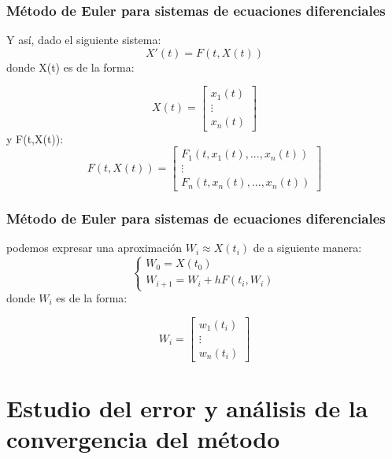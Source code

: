 \documentclass{beamer}
\begin{document}
\begin{frame}
	\frametitle{Método de Euler para sistemas de ecuaciones diferenciales}
	
	Y así, dado el siguiente sistema: $$
	X'(t)=F(t,X(t))
	$$
	donde X(t) es de la forma:
	
	\begin{equation*}
	X(t)=\begin{bmatrix}
	x_1(t) \\
	\vdots \\
	x_n(t)
	\end{bmatrix}
	\end{equation*}
	y F(t,X(t)):
	\begin{equation*}
	F(t,X(t))=\begin{bmatrix}
	F_1(t,x_1(t),...,x_n(t)) \\
	\vdots \\
	F_n(t,x_n(t),...,x_n(t))
	\end{bmatrix}
	\end{equation*}
	
	
	 
\end{frame}

\begin{frame}
	\frametitle{Método de Euler para sistemas de ecuaciones diferenciales}
	
	podemos expresar una aproximación $W_i \approx X(t_i)$ de a siguiente manera:
	$$
	\begin{cases}
	W_0=X(t_0)\\
	W_{i+1}=W_i + hF(t_i,W_i)
	\end{cases}
	$$
	donde $W_i$ es de la forma:
	
	\begin{equation*}
	W_i=\begin{bmatrix}
	w_1(t_i) \\
	\vdots \\
	w_n(t_i)
	\end{bmatrix}
	\end{equation*}
	
	
\end{frame}

\section{Estudio del error y análisis de la convergencia del método}
\end{document}
